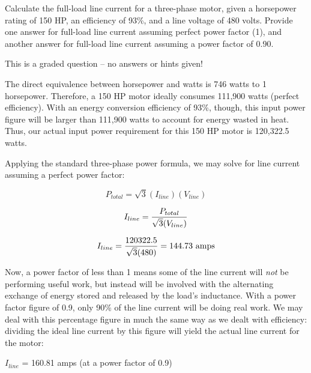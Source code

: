 

Calculate the full-load line current for a three-phase motor, given a horsepower rating of 150 HP, an efficiency of 93\%, and a line voltage of 480 volts.  Provide one answer for full-load line current assuming perfect power factor (1), and another answer for full-load line current assuming a power factor of 0.90.

\vfil 

\eject






This is a graded question -- no answers or hints given!







The direct equivalence between horsepower and watts is 746 watts to 1 horsepower.  Therefore, a 150 HP motor ideally consumes 111,900 watts (perfect efficiency).  With an energy conversion efficiency of 93\%, though, this input power figure will be larger than 111,900 watts to account for energy wasted in heat.  Thus, our actual input power requirement for this 150 HP motor is 120,322.5 watts.

\vskip 10pt

Applying the standard three-phase power formula, we may solve for line current assuming a perfect power factor:

$$P_{total} = \sqrt{3} (I_{line}) (V_{line})$$

$$I_{line} = {P_{total} \over \sqrt{3} (V_{line})}$$

$$I_{line} = {120322.5 \over \sqrt{3} (480)} = 144.73 \hbox{ amps}$$

\vskip 10pt

Now, a power factor of less than 1 means some of the line current will {\it not} be performing useful work, but instead will be involved with the alternating exchange of energy stored and released by the load's inductance.  With a power factor figure of 0.9, only 90\% of the line current will be doing real work.  We may deal with this percentage figure in much the same way as we dealt with efficiency: dividing the ideal line current by this figure will yield the actual line current for the motor:

\vskip 10pt

$I_{line}$ = 160.81 amps (at a power factor of 0.9)




